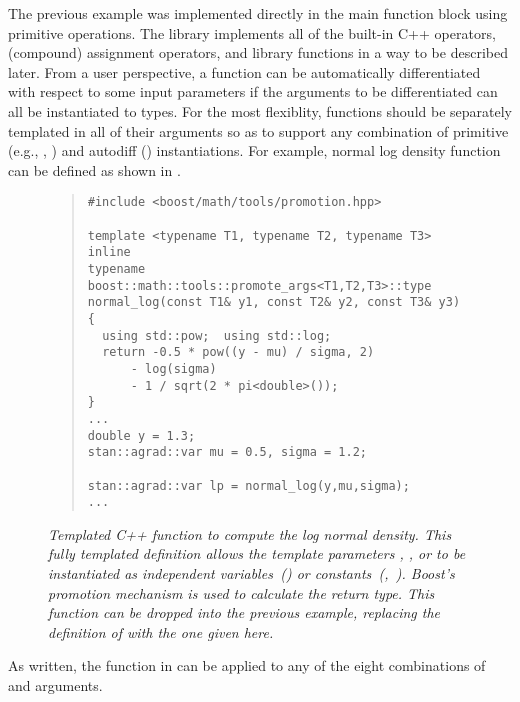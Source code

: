 \documentclass[10pt]{article}
\begin{document}
The previous example was implemented directly in the main function
block using primitive operations.  The  library
implements all of the built-in C++ operators, (compound) assignment
operators, and library functions in a way to be described later.  From
a user perspective, a function can be automatically differentiated
with respect to some input parameters if the arguments to be
differentiated can all be instantiated to  types.
For the most flexiblity, functions should be separately templated in
all of their arguments so as to support any combination of primitive
(e.g., , ) and autodiff ()
instantiations.  For example, normal log density function can be
defined as shown in .
%
\begin{figure}
\begin{quote}\small
\begin{Verbatim}
#include <boost/math/tools/promotion.hpp>

template <typename T1, typename T2, typename T3>
inline
typename boost::math::tools::promote_args<T1,T2,T3>::type
normal_log(const T1& y1, const T2& y2, const T3& y3) {
  using std::pow;  using std::log;  
  return -0.5 * pow((y - mu) / sigma, 2)
      - log(sigma)
      - 1 / sqrt(2 * pi<double>());
}
...
double y = 1.3;
stan::agrad::var mu = 0.5, sigma = 1.2;

stan::agrad::var lp = normal_log(y,mu,sigma);
...
\end{Verbatim}
\end{quote}
\vspace*{-12pt}
\caption{\small\it Templated C++ function to compute the log normal
  density.  This fully templated definition allows the template
  parameters , , or  to be instantiated as
  independent variables\, \mbox{\rm ()} or
  constants\, \mbox{\rm (, )}.  Boost's
  promotion mechanism is used to calculate the return type. This
  function can be dropped into the previous example, replacing the
  definition of  with the one given
  here.}\label{normal-log-density-function.figure}
\end{figure}
%
As written, the function in 
can be applied to any of the eight combinations of  and
 arguments.  
\end{document}
